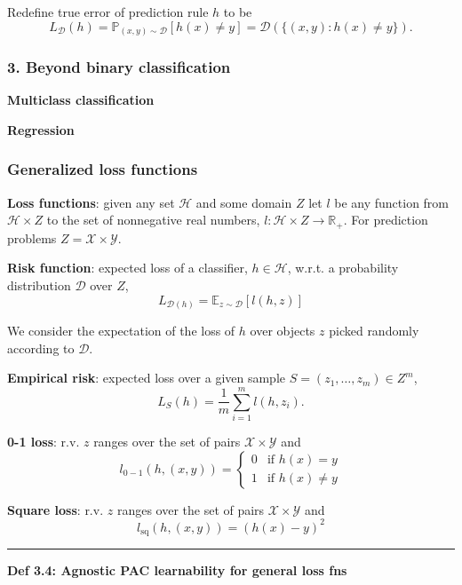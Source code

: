 Redefine true error of prediction rule $h$ to be 
$$L_{\mathcal{D}}(h) = \mathbb{P}_{(x, y) \sim \mathcal{D}}[h(x) \neq y] = \mathcal{D}(\{(x,y): h(x) \neq y\}).$$

\subsubsection{3. Beyond binary classification}

\textbf{Multiclass classification}

\textbf{Regression}

\subsubsection{Generalized loss functions}

\textbf{Loss functions}: given any set $\mathcal{H}$ and some domain $Z$ let $l$ be any function from $\mathcal{H} \times Z$ to the set of nonnegative real numbers, $l: \mathcal{H} \times Z \rightarrow \mathbb{R}_+$. For prediction problems $Z = \mathcal{X} \times \mathcal{Y}$.

\textbf{Risk function}: expected loss of a classifier, $h \in \mathcal{H}$, w.r.t. a probability distribution $\mathcal{D}$ over $Z$, 
$$L_{\mathcal{D}(h)} = \mathbb{E}_{z \sim \mathcal{D}}[l(h, z)]$$

We consider the expectation of the loss of $h$ over objects $z$ picked randomly according to $\mathcal{D}$.

\textbf{Empirical risk}: expected loss over a given sample $S = (z_1, \dots, z_m) \in Z^m$,
$$L_S(h) = \frac{1}{m} \sum_{i=1}^m l(h, z_i).$$

\textbf{0-1 loss}: r.v. $z$ ranges over the set of pairs $\mathcal{X} \times \mathcal{Y}$ and
\begin{equation*}
    l_{0-1}(h, (x, y)) = 
    \begin{cases}
        0 & \text{if } h(x) = y \\
        1 & \text{if } h(x) \neq y
    \end{cases}
\end{equation*}

\textbf{Square loss}: r.v. $z$ ranges over the set of pairs $\mathcal{X} \times \mathcal{Y}$ and
$$l_{\text{sq}}(h, (x, y)) = (h(x) - y)^2$$

\hrule height 0.06pt
\medskip

\textbf{Def 3.4: Agnostic PAC learnability for general loss fns}

